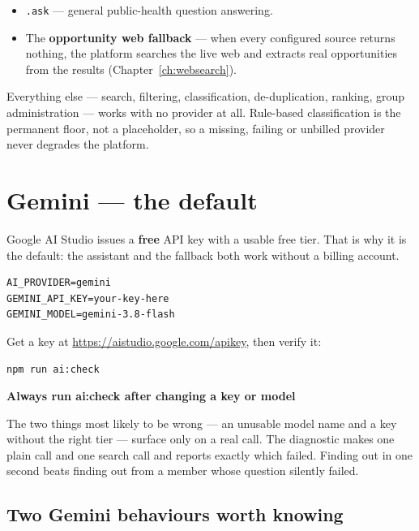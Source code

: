 \documentclass[11pt,a4paper]{report}
\newenvironment{callout}[1]
  {\begin{framed}\noindent\textbf{\textcolor{phcWarnInk}{#1}}\par\vspace{3pt}\small}
  {\end{framed}}
\newcommand{\dash}{---}
\begin{document}
\begin{itemize}
  \item \texttt{.ask} \dash{} general public-health question answering.
  \item The \textbf{opportunity web fallback} \dash{} when every configured
        source returns nothing, the platform searches the live web and extracts
        real opportunities from the results (Chapter~\ref{ch:websearch}).
\end{itemize}

Everything else \dash{} search, filtering, classification, de-duplication,
ranking, group administration \dash{} works with no provider at all.
Rule-based classification is the permanent floor, not a placeholder, so a
missing, failing or unbilled provider never degrades the platform.

\section{Gemini \dash{} the default}

Google AI Studio issues a \textbf{free} API key with a usable free tier. That
is why it is the default: the assistant and the fallback both work without a
billing account.

\begin{lstlisting}[language=envfile]
AI_PROVIDER=gemini
GEMINI_API_KEY=your-key-here
GEMINI_MODEL=gemini-3.8-flash
\end{lstlisting}

Get a key at \url{https://aistudio.google.com/apikey}, then verify it:

\begin{lstlisting}[language=bash]
npm run ai:check
\end{lstlisting}

\begin{callout}{Always run ai:check after changing a key or model}
The two things most likely to be wrong \dash{} an unusable model name and a
key without the right tier \dash{} surface only on a real call. The diagnostic
makes one plain call and one search call and reports exactly which failed.
Finding out in one second beats finding out from a member whose question
silently failed.
\end{callout}

\subsection*{Two Gemini behaviours worth knowing}
\end{document}
